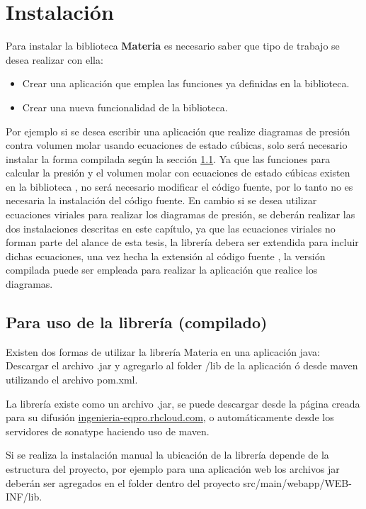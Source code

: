 \chapter{Instalación}

  Para instalar la biblioteca \textbf{Materia} es necesario saber que tipo de trabajo se desea realizar con ella:
  \begin{itemize}
    \item Crear una aplicación que emplea las funciones ya definidas en la biblioteca.
    \item Crear una nueva funcionalidad de la biblioteca.
  \end{itemize}

  Por ejemplo si se desea escribir una aplicación que realize diagramas de presión contra volumen molar usando ecuaciones de estado cúbicas, solo será necesario instalar la forma compilada según la sección \ref{sec:compiledinstall}. Ya que las funciones para calcular la presión y el volumen molar con ecuaciones de estado cúbicas existen en la biblioteca , no será necesario modificar el código fuente, por lo tanto no es necesaria la instalación del código fuente. En cambio si se desea utilizar ecuaciones viriales para realizar los diagramas de presión, se deberán realizar las dos instalaciones descritas en este capítulo, ya que las ecuaciones viriales no forman parte del alance de esta tesis, la librería debera ser extendida para incluir dichas ecuaciones, una vez hecha la extensión al código fuente , la versión compilada puede ser empleada para realizar la aplicación que realice los diagramas.


  \section{Para uso de la librería (compilado)}\label{sec:compiledinstall}

      Existen dos formas de utilizar la librería Materia en una aplicación java:
    Descargar el archivo .jar y agregarlo al folder /lib de la aplicación ó desde maven utilizando el archivo pom.xml.

    La librería existe como un archivo .jar, se puede descargar desde la página creada para su difusión \url{ingenieria-eqpro.rhcloud.com}, o automáticamente desde los servidores de sonatype haciendo uso de maven.

    Si se realiza la instalación manual la ubicación de la librería depende de la estructura del proyecto, por ejemplo para una aplicación web los archivos jar deberán ser agregados en el folder dentro del proyecto src/main/webapp/WEB-INF/lib.

